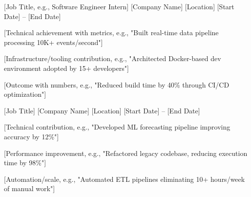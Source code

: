 

\begin{cventries}

  \cventry
    {[Job Title, e.g., Software Engineer Intern]} %
    {[Company Name]} %
    {[Location]} %
    {[Start Date] -- [End Date]} %
    {
      \begin{cvitems}
        \item {[Technical achievement with metrics, e.g., "Built real-time data pipeline processing 10K+ events/second"]}
        \item {[Infrastructure/tooling contribution, e.g., "Architected Docker-based dev environment adopted by 15+ developers"]}
        \item {[Outcome with numbers, e.g., "Reduced build time by 40\% through CI/CD optimization"]}
      \end{cvitems}
    }

  \cventry
    {[Job Title]} %
    {[Company Name]} %
    {[Location]} %
    {[Start Date] -- [End Date]} %
    {
      \begin{cvitems}
        \item {[Technical contribution, e.g., "Developed ML forecasting pipeline improving accuracy by 12\%"]}
        \item {[Performance improvement, e.g., "Refactored legacy codebase, reducing execution time by 98\%"]}
        \item {[Automation/scale, e.g., "Automated ETL pipelines eliminating 10+ hours/week of manual work"]}
      \end{cvitems}
    }

\end{cventries}
